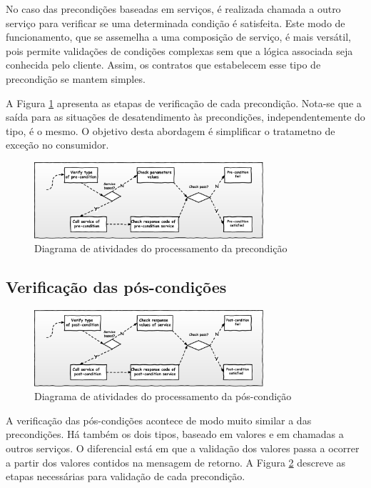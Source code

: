 No caso das precondições baseadas em serviços, é realizada chamada a outro
serviço para verificar se uma determinada condição é satisfeita. Este modo de
funcionamento, que se assemelha a uma composição de serviço, é mais versátil, pois permite
validações de condições complexas sem que a lógica associada seja conhecida pelo
cliente. Assim, os contratos que estabelecem esse tipo de
precondição se mantem simples.

A Figura \ref{FigServicePrecondition} apresenta as etapas de verificação de cada
precondição. Nota-se que a saída para as situações de desatendimento às
precondições, independentemente do tipo, é o mesmo. O objetivo desta abordagem
é simplificar o tratametno de exceção no consumidor.

\begin{figure}[!htb]
\centering
\includegraphics[width=85mm,trim = 0mm 0mm 0mm
0mm,clip]{img/FluxoPrecondicoes.pdf}
\caption{Diagrama de atividades do processamento da precondição}
\label{FigServicePrecondition}
\end{figure}


\subsection{Verificação das pós-condições}


\begin{figure}[!htb]
\centering
\includegraphics[width=85mm,trim = 0mm 0mm 0mm
0mm,clip]{img/FluxoPostcondicoes.pdf}

\caption{Diagrama de atividades do processamento da pós-condição}
\label{FigServicePostcondition}
\end{figure}

A verificação das pós-condições acontece de modo muito similar a das
precondições. Há também os dois tipos, baseado em valores e em chamadas a
outros serviços. O diferencial está em que a validação dos valores passa a
ocorrer a partir dos valores contidos na mensagem de retorno. A Figura
\ref{FigServicePostcondition} descreve as etapas necessárias para validação de
cada precondição.

